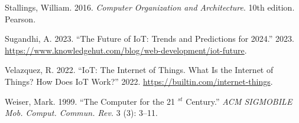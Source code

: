\documentclass[
  letterpaper,
  DIV=11,
  numbers=noendperiod]{scrreprt}
\newlength{\cslhangindent}
\newenvironment{CSLReferences}[2] %
 {\begin{list}{}{%
  \setlength{\itemindent}{0pt}
  \setlength{\leftmargin}{0pt}
  \setlength{\parsep}{0pt}
  \ifodd #1
   \setlength{\leftmargin}{\cslhangindent}
   \setlength{\itemindent}{-1\cslhangindent}
  \fi
  \setlength{\itemsep}{#2\baselineskip}}}
 {\end{list}}
\begin{document}
\begin{CSLReferences}{1}{0}
Stallings, William. 2016. \emph{Computer Organization and Architecture}.
10th edition. Pearson.

Sugandhi, A. 2023. {``The Future of IoT: Trends and Predictions for
2024.''} 2023.
\url{https://www.knowledgehut.com/blog/web-development/iot-future}.

Velazquez, R. 2022. {``IoT: The Internet of Things. What Is the Internet
of Things? How Does IoT Work?''} 2022.
\url{https://builtin.com/internet-things}.

Weiser, Mark. 1999. {``The Computer for the 21 \(^{st}\) Century.''}
\emph{ACM SIGMOBILE Mob. Comput. Commun. Rev.} 3 (3): 3--11.

\end{CSLReferences}
\end{document}
